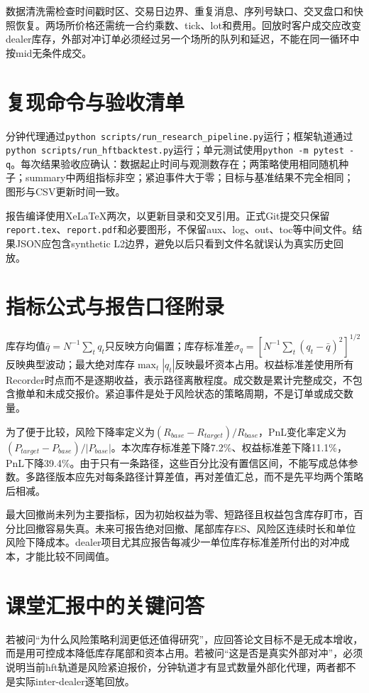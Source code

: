 \documentclass[11pt]{ctexart}
\begin{document}
数据清洗需检查时间戳时区、交易日边界、重复消息、序列号缺口、交叉盘口和快照恢复。两场所价格还需统一合约乘数、tick、lot和费用。回放时客户成交应改变dealer库存，外部对冲订单必须经过另一个场所的队列和延迟，不能在同一循环中按mid无条件成交。

\section{复现命令与验收清单}
分钟代理通过\texttt{python scripts/run\_research\_pipeline.py}运行；框架轨道通过\texttt{python scripts/run\_hftbacktest.py}运行；单元测试使用\texttt{python -m pytest -q}。每次结果验收应确认：数据起止时间与观测数存在；两策略使用相同随机种子；summary中两组指标非空；紧迫事件大于零；目标与基准结果不完全相同；图形与CSV更新时间一致。

报告编译使用XeLaTeX两次，以更新目录和交叉引用。正式Git提交只保留\texttt{report.tex}、\texttt{report.pdf}和必要图形，不保留aux、log、out、toc等中间文件。结果JSON应包含synthetic L2边界，避免以后只看到文件名就误认为真实历史回放。

\section{指标公式与报告口径附录}
库存均值$\bar q=N^{-1}\sum_t q_t$只反映方向偏置；库存标准差$\sigma_q=[N^{-1}\sum_t(q_t-\bar q)^2]^{1/2}$反映典型波动；最大绝对库存$\max_t|q_t|$反映最坏资本占用。权益标准差使用所有Recorder时点而不是逐期收益，表示路径离散程度。成交数是累计完整成交，不包含撤单和未成交报价。紧迫事件是处于风险状态的策略周期，不是订单或成交数量。

为了便于比较，风险下降率定义为$(R_{base}-R_{target})/R_{base}$，PnL变化率定义为$(P_{target}-P_{base})/|P_{base}|$。本次库存标准差下降7.2\%、权益标准差下降11.1\%，PnL下降39.4\%。由于只有一条路径，这些百分比没有置信区间，不能写成总体参数。多路径版本应先对每条路径计算差值，再对差值汇总，而不是先平均两个策略后相减。

最大回撤尚未列为主要指标，因为初始权益为零、短路径且权益包含库存盯市，百分比回撤容易失真。未来可报告绝对回撤、尾部库存ES、风险区连续时长和单位风险下降成本。dealer项目尤其应报告每减少一单位库存标准差所付出的对冲成本，才能比较不同阈值。

\section{课堂汇报中的关键问答}
若被问“为什么风险策略利润更低还值得研究”，应回答论文目标不是无成本增收，而是用可控成本降低库存尾部和资本占用。若被问“这是否是真实外部对冲”，必须说明当前hft轨道是风险紧迫报价，分钟轨道才有显式数量外部化代理，两者都不是实际inter-dealer逐笔回放。
\end{document}
